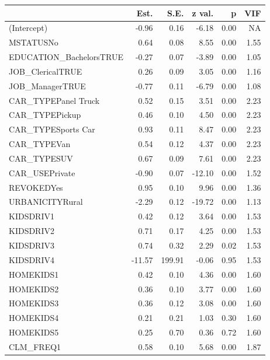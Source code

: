 \documentclass[]{article}
\begin{document}
\begin{table}[!h]
\centering
\begin{threeparttable}
\begin{tabular}{lrrrrr}
\toprule
  & Est. & S.E. & z val. & p & VIF\\
\midrule
\rowcolor{gray!6}  (Intercept) & -0.96 & 0.16 & -6.18 & 0.00 & NA\\
MSTATUSNo & 0.64 & 0.08 & 8.55 & 0.00 & 1.55\\
\rowcolor{gray!6}  EDUCATION\_BachelorsTRUE & -0.27 & 0.07 & -3.89 & 0.00 & 1.05\\
JOB\_ClericalTRUE & 0.26 & 0.09 & 3.05 & 0.00 & 1.16\\
\rowcolor{gray!6}  JOB\_ManagerTRUE & -0.77 & 0.11 & -6.79 & 0.00 & 1.08\\
\addlinespace
CAR\_TYPEPanel Truck & 0.52 & 0.15 & 3.51 & 0.00 & 2.23\\
\rowcolor{gray!6}  CAR\_TYPEPickup & 0.46 & 0.10 & 4.50 & 0.00 & 2.23\\
CAR\_TYPESports Car & 0.93 & 0.11 & 8.47 & 0.00 & 2.23\\
\rowcolor{gray!6}  CAR\_TYPEVan & 0.54 & 0.12 & 4.37 & 0.00 & 2.23\\
CAR\_TYPESUV & 0.67 & 0.09 & 7.61 & 0.00 & 2.23\\
\addlinespace
\rowcolor{gray!6}  CAR\_USEPrivate & -0.90 & 0.07 & -12.10 & 0.00 & 1.52\\
REVOKEDYes & 0.95 & 0.10 & 9.96 & 0.00 & 1.36\\
\rowcolor{gray!6}  URBANICITYRural & -2.29 & 0.12 & -19.72 & 0.00 & 1.13\\
KIDSDRIV1 & 0.42 & 0.12 & 3.64 & 0.00 & 1.53\\
\rowcolor{gray!6}  KIDSDRIV2 & 0.71 & 0.17 & 4.25 & 0.00 & 1.53\\
\addlinespace
KIDSDRIV3 & 0.74 & 0.32 & 2.29 & 0.02 & 1.53\\
\rowcolor{gray!6}  KIDSDRIV4 & -11.57 & 199.91 & -0.06 & 0.95 & 1.53\\
HOMEKIDS1 & 0.42 & 0.10 & 4.36 & 0.00 & 1.60\\
\rowcolor{gray!6}  HOMEKIDS2 & 0.36 & 0.10 & 3.77 & 0.00 & 1.60\\
HOMEKIDS3 & 0.36 & 0.12 & 3.08 & 0.00 & 1.60\\
\addlinespace
\rowcolor{gray!6}  HOMEKIDS4 & 0.21 & 0.21 & 1.03 & 0.30 & 1.60\\
HOMEKIDS5 & 0.25 & 0.70 & 0.36 & 0.72 & 1.60\\
\rowcolor{gray!6}  CLM\_FREQ1 & 0.58 & 0.10 & 5.68 & 0.00 & 1.87\\

\end{tabular}
\end{threeparttable}
\end{table}
\end{document}
